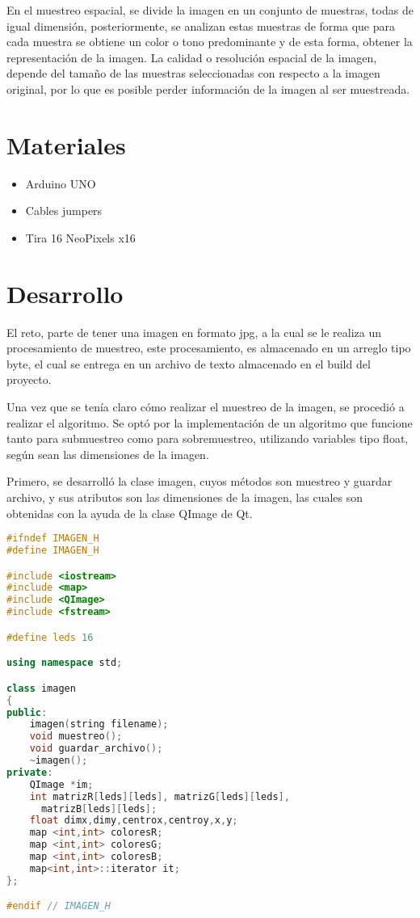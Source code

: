 \documentclass{article}
\begin{document}
En el muestreo espacial, se divide la imagen en un conjunto de muestras, todas de igual dimensión, posteriormente, se analizan estas muestras de forma que para cada muestra se obtiene un color o tono predominante y de esta forma, obtener la representación de la imagen. La calidad o resolución espacial de la imagen, depende del tamaño de las muestras seleccionadas con respecto a la imagen original, por lo que es posible perder información de la imagen al ser muestreada.

\section{Materiales} \label{materiales}
\begin{itemize}
    \item Arduino UNO
    \item Cables jumpers
    \item Tira 16 NeoPixels x16
\end{itemize}

\section{Desarrollo} \label{desarrollo}
El reto, parte de tener una imagen en formato jpg, a la cual se le realiza un procesamiento de muestreo, este procesamiento, es almacenado en un arreglo tipo byte, el cual se entrega en un archivo de texto almacenado en el build del proyecto.

Una vez que se tenía claro cómo realizar el muestreo de la imagen, se procedió a realizar el algoritmo. Se optó por la implementación de un algoritmo que funcione tanto para submuestreo como para sobremuestreo, utilizando variables tipo float, según sean las dimensiones de la imagen.

Primero, se desarrolló la clase imagen, cuyos métodos son muestreo y guardar archivo, y sus atributos son las dimensiones de la imagen, las cuales son obtenidas con la ayuda de la clase QImage de Qt.

\begin{lstlisting}[language=C++, label=Clase]
#ifndef IMAGEN_H
#define IMAGEN_H

#include <iostream>
#include <map>
#include <QImage>
#include <fstream>

#define leds 16

using namespace std;

class imagen
{
public:
    imagen(string filename);
    void muestreo();
    void guardar_archivo();
    ~imagen();
private:
    QImage *im;
    int matrizR[leds][leds], matrizG[leds][leds],
      matrizB[leds][leds];
    float dimx,dimy,centrox,centroy,x,y;
    map <int,int> coloresR;
    map <int,int> coloresG;
    map <int,int> coloresB;
    map<int,int>::iterator it;
};

#endif // IMAGEN_H

\end{lstlisting}
\end{document}
